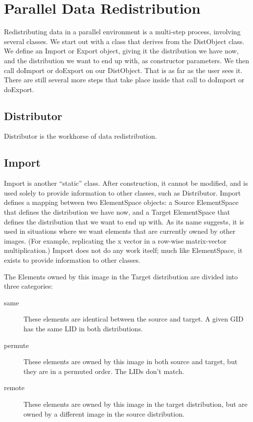 \documentclass[10pt,relax]{TpetraDesign}
\begin{document}
%
\section{Parallel Data Redistribution}

Redistributing data in a parallel environment is a multi-step process, involving several classes. We start out with a class that derives from the DistObject class. We define an Import or Export object, giving it the distribution we have now, and the distribution we want to end up with, as constructor parameters. We then call doImport or doExport on our DistObject. That is as far as the user sees it. There are still several more steps that take place inside that call to doImport or doExport.

\subsection{Distributor}

Distributor is the workhorse of data redistribution. 

%
\subsection{Import}

Import is another ``static'' class. After construction, it cannot be modified, and is used solely to provide information to other classes, such as Distributor. Import defines a mapping between two ElementSpace objects: a Source ElementSpace that defines the distribution we have now, and a Target ElementSpace that defines the distribution that we want to end up with. As its name suggests, it is used in situations where we want elements that are currently owned by other images. (For example, replicating the x vector in a row-wise matrix-vector multiplication.) Import does not do any work itself; much like ElementSpace, it exists to provide information to other classes. 

The Elements owned by this image in the Target distribution are divided into three categories:
\begin{description}
\item[same] These elements are identical between the source and target. A given GID has the same LID in both distributions. 

\item[permute] These elements are owned by this image in both source and target, but they are in a permuted order. The LIDs don't match.

\item[remote] These elements are owned by this image in the target distribution, but are owned by a different image in the source distribution.
\end{description}
\end{document}
